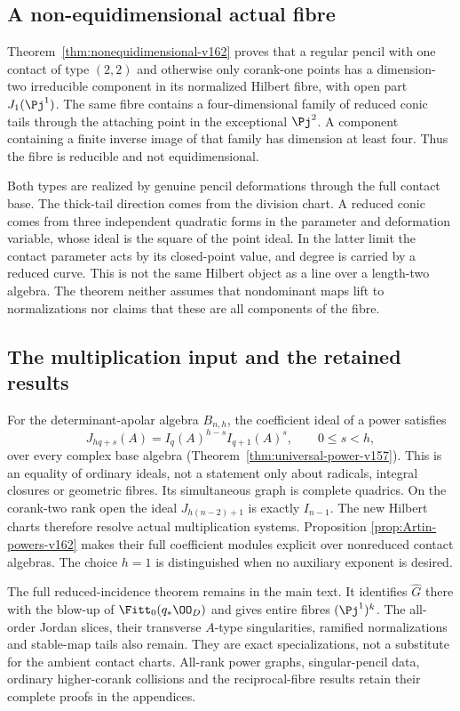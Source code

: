 \subsection{A non-equidimensional actual fibre}
Theorem~\ref{thm:nonequidimensional-v162} proves that a regular
pencil with one contact of type $(2,2)$ and otherwise only corank-one
points has a dimension-two irreducible component in its normalized
Hilbert fibre, with open part $J_1(\Pj^1)$. The same fibre contains
a four-dimensional family of reduced conic tails through the
attaching point in the exceptional $\Pj^2$. A component containing
a finite inverse image of that family has dimension at least four.
Thus the fibre is reducible and not equidimensional.

Both types are realized by genuine pencil deformations through the
full contact base. The thick-tail direction comes from the division
chart. A reduced conic comes from three independent quadratic forms
in the parameter and deformation variable, whose ideal is the square
of the point ideal. In the latter limit the contact parameter acts
by its closed-point value, and degree is carried by a reduced curve.
This is not the same Hilbert object as a line over a length-two
algebra. The theorem neither assumes that nondominant maps lift to
normalizations nor claims that these are all components of the fibre.

\subsection{The multiplication input and the retained results}
For the determinant-apolar algebra $B_{n,h}$, the coefficient ideal
of a power satisfies
\[
 J_{hq+s}(A)=I_q(A)^{h-s}I_{q+1}(A)^s,
                          \qquad0\leq s<h,
\]
over every complex base algebra (Theorem~\ref{thm:universal-power-v157}).
This is an equality of ordinary ideals, not a statement only about
radicals, integral closures or geometric fibres. Its simultaneous
graph is complete quadrics. On the corank-two rank open the ideal
$J_{h(n-2)+1}$ is exactly $I_{n-1}$. The new Hilbert charts therefore
resolve actual multiplication systems. Proposition
\ref{prop:Artin-powers-v162} makes their full coefficient modules
explicit over nonreduced contact algebras. The choice $h=1$ is
distinguished when no auxiliary exponent is desired.

The full reduced-incidence theorem remains in the main text. It
identifies $\widehat G$ there with the blow-up of
$\Fitt_0(q_*\OO_D)$ and gives entire fibres $(\Pj^1)^k$.
The all-order Jordan slices, their transverse $A$-type singularities,
ramified normalizations and stable-map tails also remain. They
are exact specializations, not a substitute for the ambient contact
charts. All-rank power graphs, singular-pencil data, ordinary
higher-corank collisions and the reciprocal-fibre results retain
their complete proofs in the appendices.

